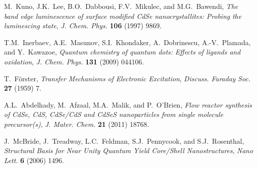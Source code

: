 \documentclass[cits]{JINST}
\begin{document}
\begin{thebibliography}{9}
M.~Kuno, J.K.~Lee, B.O.~Dabbousi, F.V.~Mikulec, and M.G.~Bawendi, \emph{The band edge luminescence of surface modified CdSe nanocrystallites: Probing the luminescing state}, \emph{J. Chem. Phys.} {\bf 106} (1997) 9869.

T.M.~Inerbaev, A.E.~Masunov, S.I.~Khondaker, A.~Dobrinescu, A.-V.~Plamada, and Y.~Kawazoe, \emph{Quantum chemistry of quantum dots: Effects of ligands and oxidation}, \emph{J. Chem. Phys.} {\bf 131} (2009) 044106. 

T.~F\"{o}rster, \emph{Transfer Mechanisms of Electronic Excitation}, \emph{Discuss. Faraday Soc.} {\bf 27} (1959) 7.

A.L.~Abdelhady, M.~Afzaal, M.A.~Malik, and P.~O'Brien, \emph{Flow reactor synthesis of CdSe, CdS, CdSe/CdS and CdSeS nanoparticles from single molecule precursor(s)}, \emph{J. Mater. Chem.} {\bf 21} (2011) 18768.

J.~McBride, J.~Treadway, L.C.~Feldman, S.J.~Pennycook, and S.J.~Rosenthal, \emph{Structural Basis for Near Unity Quantum Yield Core/Shell Nanostructures}, \emph{Nano Lett.} {\bf 6} (2006) 1496.




\end{thebibliography}
\end{document}
